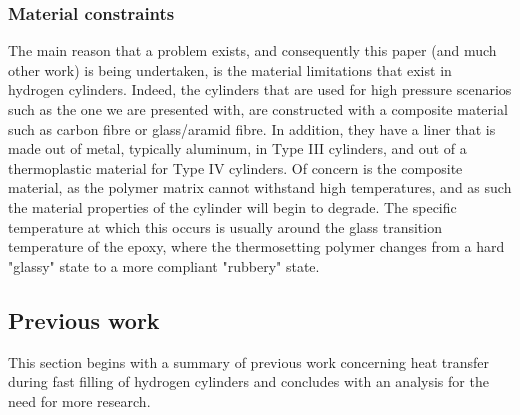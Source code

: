 



\subsubsection{Material constraints} 
\label{sec:materialConstraints}
The main reason that a problem exists, and consequently this paper (and much other work) is being undertaken, is the material limitations that exist in hydrogen cylinders. Indeed, the cylinders that are used for high pressure scenarios such as the one we are presented with, are constructed with a composite material such as carbon fibre or glass/aramid fibre. In addition, they have a liner that is made out of metal, typically aluminum, in Type III cylinders, and out of a thermoplastic material for Type IV cylinders. Of concern is the composite material, as the polymer matrix cannot withstand high temperatures, and as such the material properties of the cylinder will begin to degrade. The specific temperature at which this occurs is usually around the glass transition temperature of the epoxy, where the thermosetting polymer changes from a hard "glassy" state to a more compliant "rubbery" state.  

\subsection{Previous work}


This section begins with  a summary of previous work concerning heat transfer during fast filling of hydrogen cylinders and concludes with an analysis for the need for more research. 




